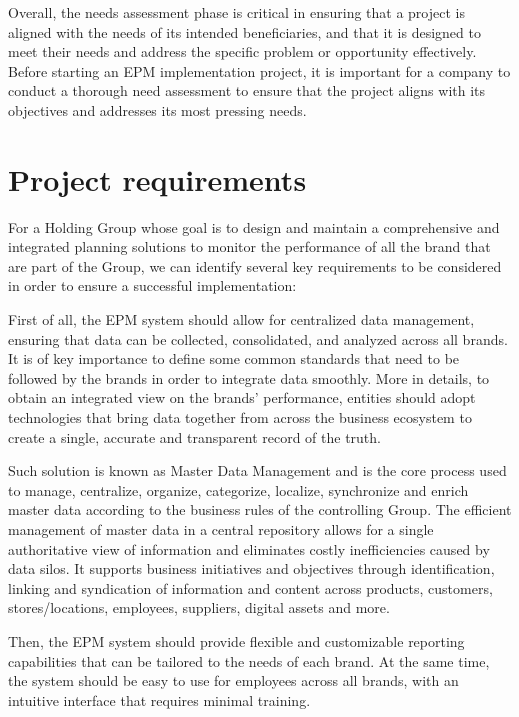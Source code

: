 \documentclass[12pt,a4paper,openright,twoside]{book}
\begin{document}
Overall, the needs assessment phase is critical in ensuring that a project is aligned with the needs of its intended beneficiaries, and that it is designed to meet their needs and address the specific problem or opportunity effectively.
%
Before starting an EPM implementation project, it is important for a company to conduct a thorough need assessment to ensure that the project aligns with its objectives and addresses its most pressing needs.

\section{Project requirements}

For a Holding Group whose goal is to design and maintain a comprehensive and integrated planning solutions to monitor the performance of all the brand that are part of the Group, we can identify several key requirements to be considered in order to ensure a successful implementation:

First of all, the EPM system should allow for centralized data management, ensuring that data can be collected, consolidated, and analyzed across all brands.
%
It is of key importance to define some common standards that need to be followed by the brands in order to integrate data smoothly.
%
More in details, to obtain an integrated view on the brands' performance, entities should adopt technologies that bring data together from across the business ecosystem to create a single, accurate and transparent record of the truth.

Such solution is known as Master Data Management and is the core process used to manage, centralize, organize, categorize, localize, synchronize and enrich master data according to the business rules of the controlling Group.
%
The efficient management of master data in a central repository allows for a single authoritative view of information and eliminates costly inefficiencies caused by data silos.
%
It supports business initiatives and objectives through identification, linking and syndication of information and content across products, customers, stores/locations, employees, suppliers, digital assets and more.

Then, the EPM system should provide flexible and customizable reporting capabilities that can be tailored to the needs of each brand.
%
At the same time, the system should be easy to use for employees across all brands, with an intuitive interface that requires minimal training.
\end{document}
